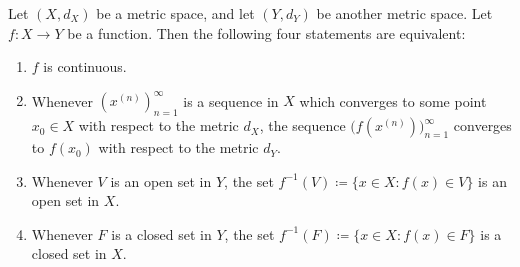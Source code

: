 \begin{theorem}\label{2.1.5}
    Let \((X, d_X)\) be a metric space, and let \((Y, d_Y)\) be another metric space.
    Let \(f : X \to Y\) be a function.
    Then the following four statements are equivalent:
    \begin{enumerate}
        \item \(f\) is continuous.
        \item Whenever \((x^{(n)})_{n = 1}^\infty\) is a sequence in \(X\) which converges to some point \(x_0 \in X\) with respect to the metric \(d_X\), the sequence \(\big(f(x^{(n)})\big)_{n = 1}^\infty\) converges to \(f(x_0)\) with respect to the metric \(d_Y\).
        \item Whenever \(V\) is an open set in \(Y\), the set \(f^{-1}(V) \coloneqq \{x \in X : f(x) \in V\}\) is an open set in \(X\).
        \item Whenever \(F\) is a closed set in \(Y\), the set \(f^{-1}(F) \coloneqq \{x \in X : f(x) \in F\}\) is a closed set in \(X\).
    \end{enumerate}
\end{theorem}

